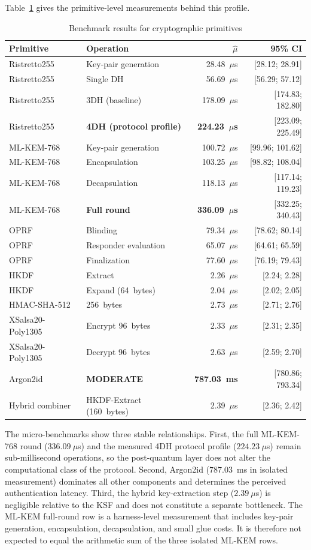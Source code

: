 \documentclass{ieeeijc}
\theoremstyle{remark}
\begin{document}
Table~\ref{tab:micro-bench} gives the primitive-level measurements
behind this profile.

\begin{table}[t]
\caption{Benchmark results for cryptographic primitives}
\label{tab:micro-bench}
\centering\small
\begin{tabular*}{\textwidth}{@{\extracolsep{\fill}}llrr@{}}
\toprule
Primitive & Operation & $\hat{\mu}$ & 95\% CI \\
\midrule
Ristretto255 & Key-pair generation & 28.48~$\mu$s & [28.12; 28.91] \\
Ristretto255 & Single DH & 56.69~$\mu$s & [56.29; 57.12] \\
Ristretto255 & 3DH (baseline) & 178.09~$\mu$s & [174.83; 182.80] \\
Ristretto255 & \textbf{4DH (protocol profile)} & \textbf{224.23~$\mu$s} & [223.09; 225.49] \\
ML-KEM-768 & Key-pair generation & 100.72~$\mu$s & [99.96; 101.62] \\
ML-KEM-768 & Encapsulation & 103.25~$\mu$s & [98.82; 108.04] \\
ML-KEM-768 & Decapsulation & 118.13~$\mu$s & [117.14; 119.23] \\
ML-KEM-768 & \textbf{Full round} & \textbf{336.09~$\mu$s} & [332.25; 340.43] \\
OPRF & Blinding & 79.34~$\mu$s & [78.62; 80.14] \\
OPRF & Responder evaluation & 65.07~$\mu$s & [64.61; 65.59] \\
OPRF & Finalization & 77.60~$\mu$s & [76.19; 79.43] \\
HKDF & Extract & 2.26~$\mu$s & [2.24; 2.28] \\
HKDF & Expand (64~bytes) & 2.04~$\mu$s & [2.02; 2.05] \\
HMAC-SHA-512 & 256~bytes & 2.73~$\mu$s & [2.71; 2.76] \\
XSalsa20-Poly1305 & Encrypt 96~bytes & 2.33~$\mu$s & [2.31; 2.35] \\
XSalsa20-Poly1305 & Decrypt 96~bytes & 2.63~$\mu$s & [2.59; 2.70] \\
Argon2id & \textbf{MODERATE} & \textbf{787.03~ms} & [780.86; 793.34] \\
Hybrid combiner & HKDF-Extract (160~bytes) & 2.39~$\mu$s & [2.36; 2.42] \\
\bottomrule
\end{tabular*}
\end{table}

The micro-benchmarks show three stable relationships. First, the full
ML-KEM-768 round ($336.09~\mu$s) and the measured 4DH protocol profile
($224.23~\mu$s) remain sub-millisecond operations, so the
post-quantum layer does not alter the computational class of the
protocol. Second, Argon2id ($787.03$~ms in isolated measurement)
dominates all other components and determines the perceived
authentication latency. Third, the hybrid key-extraction step
($2.39~\mu$s) is negligible relative to the KSF and does not
constitute a separate bottleneck.
The ML-KEM full-round row is a harness-level measurement that includes
key-pair generation, encapsulation, decapsulation, and small glue costs. It
is therefore not expected to equal the arithmetic sum of the three isolated
ML-KEM rows.
\end{document}
